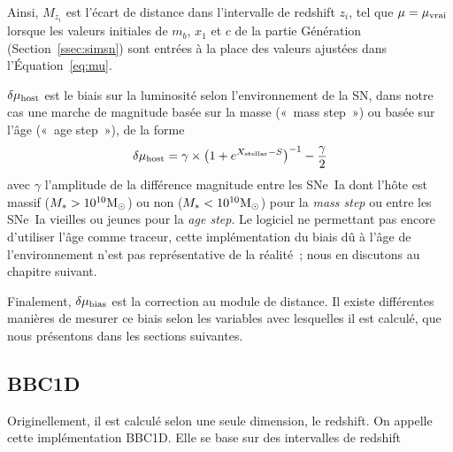 \documentclass[../main/main.tex]{subfiles}
\begin{document}
Ainsi, $M_{z_i}$ est l'écart de distance dans l'intervalle de redshift $z_i$,
tel que $\mu = \mu_{\rm vrai}$ lorsque les valeurs initiales de $m_b$, $x_1$ et
$c$ de la partie Génération (Section~\ref{ssec:simsn}) sont entrées à la place
des valeurs ajustées dans l'Équation~\ref{eq:mu}.

$\delta\mu_{\rm host}$ est le biais sur la luminosité selon l'environnement de
la SN, dans notre cas une marche de magnitude basée sur la masse («~mass step~»)
ou basée sur l'âge («~age step~»), de la forme
\begin{equation}
    \delta\mu_{\rm host} = \gamma\times \left( 1 + e^{X_{\rm stellar}-S}
    \right)^{-1} - \frac{\gamma}{2}
\end{equation}
avec $\gamma$ l'amplitude de la différence magnitude entre les SNe~Ia dont
l'hôte est massif ($M_* > 10^{10}\si{\Msun}$) ou non ($M_* < 10^{10}\si{\Msun}$)
pour la \textit{mass step} ou entre les SNe~Ia vieilles ou jeunes pour la
\textit{age step}. Le logiciel ne permettant pas encore d'utiliser l'âge comme
traceur, cette implémentation du biais dû à l'âge de l'environnement n'est pas
représentative de la réalité~; nous en discutons au chapitre suivant.

Finalement, $\delta\mu_{\rm bias}$ est la correction au module de distance. Il
existe différentes manières de mesurer ce biais selon les variables avec
lesquelles il est calculé, que nous présentons dans les sections suivantes.

\subsection{BBC1D}\label{ssec:bbc1D}

Originellement, il est calculé selon une seule dimension, le redshift. On
appelle cette implémentation BBC1D. Elle se base sur des intervalles de redshift

\end{document}
